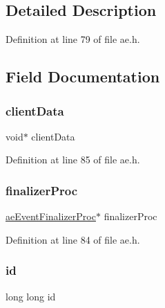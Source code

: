 \subsection{Detailed Description}


Definition at line 79 of file ae.\+h.



\subsection{Field Documentation}
\mbox{\label{structae_time_event_a31433b6f2825807bd6d9c0675ff7c4cb}} 
\subsubsection{\texorpdfstring{client\+Data}{clientData}}
{\footnotesize\ttfamily void$\ast$ client\+Data}



Definition at line 85 of file ae.\+h.

\mbox{\label{structae_time_event_ac3fd2be96fd0c8c3f4fe9aff811afb80}} 
\subsubsection{\texorpdfstring{finalizer\+Proc}{finalizerProc}}
{\footnotesize\ttfamily \hyperlink{ae_8h_a82c64cc6b7c71e2b7bae4e6b18f42c54}{ae\+Event\+Finalizer\+Proc}$\ast$ finalizer\+Proc}



Definition at line 84 of file ae.\+h.

\mbox{\label{structae_time_event_ab87bfb64728d3251718dbf51ef534b60}} 
\subsubsection{\texorpdfstring{id}{id}}
{\footnotesize\ttfamily long long id}



